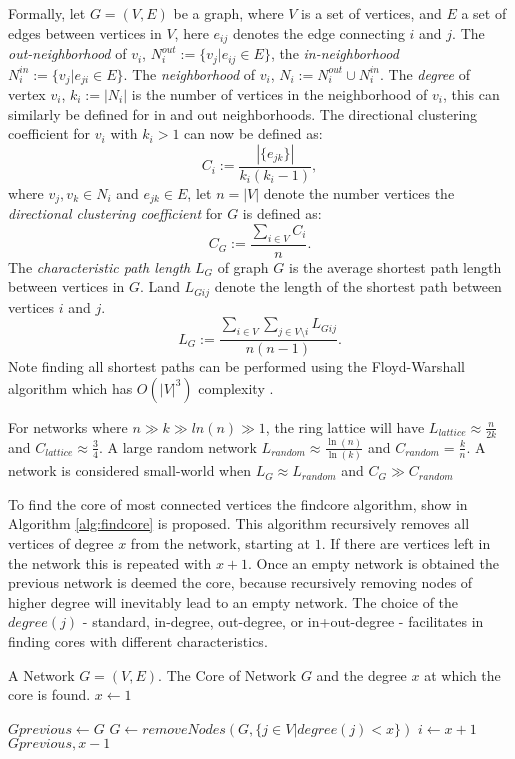 Formally, let $G=(V, E)$ be a graph, where $V$ is a set of vertices, and $E$ a set of edges between vertices in $V$, here $e_{ij}$ denotes the edge connecting $i$ and $j$.  The \textit{out-neighborhood} of $v_i$, $N_i^{out}:=\{v_j|e_{ij}\in E\}$, the \textit{in-neighborhood} $N_i^{in}:=\{v_j|e_{ji}\in E\}$. The \textit{neighborhood} of $v_i$, $N_i:=N_i^{out}\cup N_i^{in}$. The \textit{degree} of vertex $v_i$, $k_i:=|N_i|$ is the number of vertices in the neighborhood of $v_i$, this can similarly be defined for in and out neighborhoods. The directional clustering coefficient for $v_i$ with $k_i>1$ can now be defined as:
$$C_i :=\frac{|\{e_{jk}\}|}{k_i(k_i-1)},$$
where $v_j,v_k\in N_i$ and $e_{jk}\in E$, let $n=|V|$ denote the number vertices the \textit{directional clustering coefficient} for $G$ is defined as:
$$C_G:=\frac{\sum_{i\in V} C_i}{n}.$$
The \textit{characteristic path length} $L_G$ of graph $G$ is the average shortest path length between vertices in $G$. Land  $L_{Gij}$ denote the length of the shortest path between vertices $i$ and $j$. 
$$L_G:= \frac{\sum_{i\in V} \sum_{j \in V\setminus i}L_{Gij}}{n(n-1)}.$$ 
Note finding all shortest paths can be performed using the Floyd-Warshall algorithm which has $O(|V|^3)$ complexity \cite{Floyd}.

For networks where $n\gg k\gg ln(n) \gg1$, the ring lattice will have $L_{lattice}\approx\frac{n}{2k}$ and $C_{lattice}\approx\frac{3}{4}$.
A large random network  $ L_{random}\approx\frac{\ln(n)}{\ln(k)}$ and $C_{random}=\frac{k}{n}$. A network is considered small-world when $L_G\approx L_{random}$ and $C_G \gg C_{random}$

To find the core of most connected vertices the findcore algorithm, show in Algorithm \ref{alg:findcore} is proposed. This algorithm recursively removes all vertices of degree $x$ from the network, starting at $1$. If there are vertices left in the network this is repeated with  $x+1$. Once an empty network is obtained the previous network is deemed the core, because recursively removing nodes of higher degree will inevitably lead to an empty network. The choice of the $degree(j)$ - standard, in-degree, out-degree,  or in+out-degree - facilitates in finding cores with different characteristics.

\newcommand{\FindCore}{\ensuremath{\mbox{\sc FindCore}}}
\begin{algorithm}[h!]
\caption{$\FindCore(Network)$}\label{alg:findcore}
\begin{algorithmic}
\REQUIRE A Network $G=(V,E)$.
\ENSURE The Core of Network $G$ and the degree $x$ at which the core is found.
\medskip
\STATE $x\gets 1$
	
	\STATE $Gprevious \gets G$
		\STATE $G\gets removeNodes(G, \{j\in V | degree(j)<x\})$ 
	\ENDWHILE
	\STATE $i \gets x+1$
\ENDWHILE
\RETURN $Gprevious, x-1$
\end{algorithmic}
\end{algorithm}